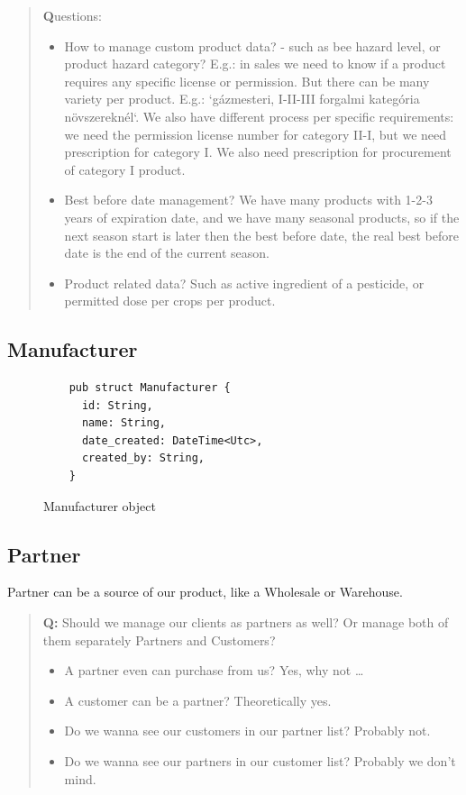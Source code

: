 \documentclass{article}
\begin{document}
\begin{quote}
  {\large \textbf{Q}uestions:}
  \begin{itemize}
    \item How to manage custom product data? - such as bee hazard level,
      or product hazard category? E.g.: in sales we need to know if a
      product requires any specific license or permission. But there can
      be many variety per product. E.g.: `gázmesteri, I-II-III forgalmi
      kategória növszereknél`. We also have different process per specific
      requirements: we need the permission license number for category
      II-I, but we need prescription for category I. We also need
      prescription for procurement of category I product.
    \item Best before date management? We have many products with 1-2-3
      years of expiration date, and we have many seasonal products, so
      if the next season start is later then the best before date, the real
      best before date is the end of the current season.
    \item Product related data? Such as active ingredient of a pesticide,
      or permitted dose per crops per product.
  \end{itemize}
\end{quote}

\subsection{Manufacturer}

\begin{figure}[!htb]
  \caption{Manufacturer object}
  \begin{verbatim}
    pub struct Manufacturer {
      id: String,
      name: String,
      date_created: DateTime<Utc>,
      created_by: String,
    }
  \end{verbatim}
\end{figure}

\newpage
\subsection{Partner}

Partner can be a source of our product, like a Wholesale or Warehouse.

\begin{quote}
  {\large \textbf{Q:}} Should
  we manage our clients as partners as well?
  Or manage both of them separately Partners and Customers?
  \begin{itemize}
    \item A partner even can purchase from us? Yes, why not \dots
    \item A customer can be a partner? Theoretically yes.
    \item Do we wanna see our customers in our partner list? Probably not.
    \item Do we wanna see our partners in our customer list? Probably we don't mind.
  \end{itemize}
\end{quote}
\end{document}
